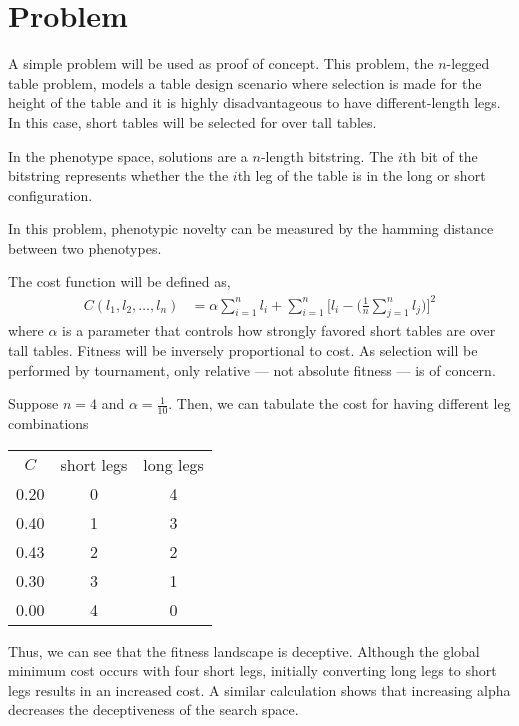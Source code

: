 \section{Problem} \label{sec:problem}

A simple problem will be used as proof of concept.
This problem, the $n$-legged table problem, models a table design scenario where selection is made for the height of the table and it is highly disadvantageous to have different-length legs.
In this case, short tables will be selected for over tall tables.

In the phenotype space, solutions are a $n$-length bitstring.
The $i$th bit of the bitstring represents whether the the $i$th leg of the table is in the long or short configuration.

In this problem, phenotypic novelty can be measured by the hamming distance between two phenotypes.

The cost function will be defined as,
\begin{align*}
C(l_1, l_2, \ldots, l_n)
&=
\alpha \sum_{i = 1}^{n} l_i
+
\sum_{i=1}^n \Big[l_i - \Big(\frac{1}{n} \sum_{j=1}^n l_j\Big)\Big]^2
\end{align*}
where $\alpha$ is a parameter that controls how strongly favored short tables are over tall tables.
Fitness will be inversely proportional to cost.
As selection will be performed by tournament, only relative --- not absolute fitness --- is of concern.

Suppose $n=4$ and $\alpha = \frac{1}{10}$.
Then, we can tabulate the cost for having different leg combinations
\begin{center}
\begin{tabular}{ c c c }
 $C$ & short legs & long legs \\
 0.20 & 0 & 4 \\
 0.40 & 1 & 3 \\
 0.43 & 2 & 2 \\
 0.30 & 3 & 1 \\
 0.00 & 4 & 0
\end{tabular}
\end{center}
Thus, we can see that the fitness landscape is deceptive.
Although the global minimum cost occurs with four short legs, initially converting long legs to short legs results in an increased cost.
A similar calculation shows that increasing alpha decreases the deceptiveness of the search space.
